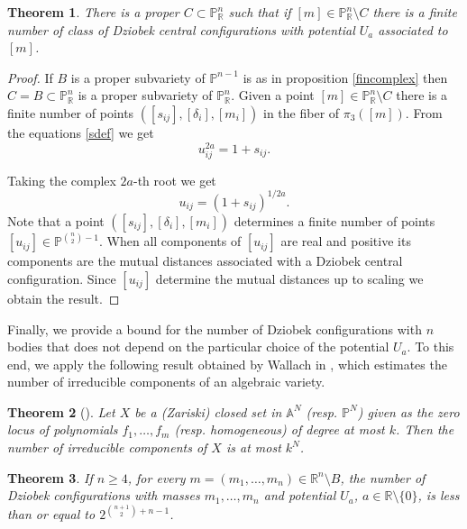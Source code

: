 \documentclass{amsart}
\newtheorem{theorem}{Theorem}[section]
\theoremstyle{definition}
\theoremstyle{remark}
\numberwithin{equation}{section}
\begin{document}
\begin{theorem}\label{prop:main}
There is a proper $C \subset \mathbb{P}_{\mathbb{R}}^{n}$ such that if $[m] \in \mathbb{P}_{\mathbb{R}}^{n}\setminus C$  there is a finite number of class of Dziobek central configurations with potential $U_{a}$ associated to $[m]$. 
\end{theorem}
\begin{proof}
If $B$ is a proper subvariety of $\mathbb{P}^{n-1}$ is as in proposition \ref{fincomplex} then $C=B \subset \mathbb{P}_{\mathbb{R}}^n$ is a proper subvariety of $\mathbb{P}_{\mathbb{R}}^{n}$. Given a point $[m] \in \mathbb{P}_{\mathbb{R}}^{n} \setminus C$ there is a finite number of points $([s_{ij}],[\delta_i],[m_i])$ in the fiber of $\pi_{3}([m])$. From the equations \eqref{sdef} we get
$$u_{ij}^{2a}= 1 + s_{ij}.$$

Taking the complex $2a$-th root we get
$$u_{ij}=\left(1+s_{ij}\right)^{1/2a}.$$
Note that a point $([s_{ij}],[\delta_i],[m_i])$ determines a finite number of points $[u_{ij}] \in \mathbb{P}^{\binom{n}{2}-1}$. When all components of $[u_{ij}]$ are real and positive its components are the mutual distances associated with a Dziobek central configuration. Since $[u_{ij}]$ determine the mutual distances up to scaling we obtain the result. 
\end{proof}


Finally, we provide a bound for the number of Dziobek configurations with $n$ bodies that does not depend on the particular choice of the potential $U_a$. To this end, we apply the following result obtained by Wallach in \cite{wallach1996theorem}, which estimates the number of irreducible components of an algebraic variety.

\begin{theorem}[{\cite[Thm. 7.1]{wallach1996theorem}}] \label{genbound}
Let $X$ be a (Zariski) closed set in $\mathbb{A}^N$ (resp. $\mathbb{P}^N$) given as the zero locus of polynomials $f_1, \dots, f_m$ (resp. homogeneous) of degree at most $k$. Then the number of irreducible components of $X$ is at most $k^N$.
\end{theorem}

\begin{theorem}\label{dzio}
If $n \geq 4$, for every $m = (m_1, \dots, m_n) \in \mathbb{R}^n \setminus B$, the number of Dziobek configurations with masses $m_1, \dots, m_n$ and potential $U_a$, $a \in \mathbb{R}\setminus \{0\}$, is less than or equal to $2^{\binom{n+1}{2}+n-1}$.
\end{theorem}
\end{document}
